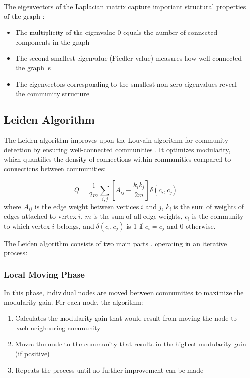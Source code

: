 The eigenvectors of the Laplacian matrix capture important structural properties of the graph \cite{chung1997spectral}:
\begin{itemize}
    \item The multiplicity of the eigenvalue 0 equals the number of connected components in the graph
    \item The second smallest eigenvalue (Fiedler value) measures how well-connected the graph is
    \item The eigenvectors corresponding to the smallest non-zero eigenvalues reveal the community structure
\end{itemize}

\subsection{Leiden Algorithm}
\label{subsec:LeidenAlgorithm}

The Leiden algorithm improves upon the Louvain algorithm for community detection by ensuring well-connected communities \cite{traag2019louvain}. It optimizes modularity, which quantifies the density of connections within communities compared to connections between communities:

\begin{equation}
    Q = \frac{1}{2m} \sum_{i,j} \left[A_{ij} - \frac{k_i k_j}{2m}\right] \delta(c_i, c_j)
\end{equation}
where $A_{ij}$ is the edge weight between vertices $i$ and $j$, $k_i$ is the sum of weights of edges attached to vertex $i$, $m$ is the sum of all edge weights, $c_i$ is the community to which vertex $i$ belongs, and $\delta(c_i, c_j)$ is 1 if $c_i = c_j$ and 0 otherwise.

The Leiden algorithm consists of two main parts \cite{traag2019louvain, traag2011narrow}, operating in an iterative process:

\subsubsection{Local Moving Phase}
In this phase, individual nodes are moved between communities to maximize the modularity gain. For each node, the algorithm:

\begin{enumerate}
    \item Calculates the modularity gain that would result from moving the node to each neighboring community
    \item Moves the node to the community that results in the highest modularity gain (if positive)
    \item Repeats the process until no further improvement can be made
\end{enumerate}

